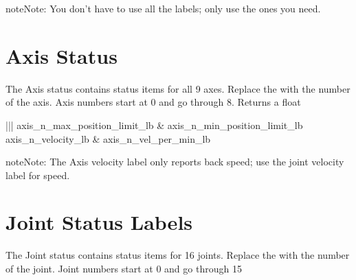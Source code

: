 \documentclass[letterpaper,10pt,english]{sphinxmanual}
\begin{document}
\begin{sphinxadmonition}{note}{Note:}
\sphinxAtStartPar
You don’t have to use all the labels; only use the ones you need.
\end{sphinxadmonition}


\section{Axis Status}
\label{\detokenize{labels:axis-status}}
\sphinxAtStartPar
The Axis status contains status items for all 9 axes. Replace the  with
the number of the axis. Axis numbers start at 0 and go through 8. Returns a
float


\begin{savenotes}\sphinxattablestart
\sphinxthistablewithglobalstyle
\centering
{}
\sphinxthecaptionisattop
{}\label{\detokenize{labels:id2}}
\sphinxaftertopcaption
\begin{tabular}[t]{|||}
\sphinxtoprule
\sphinxtableatstartofbodyhook
\sphinxAtStartPar
axis\_n\_max\_position\_limit\_lb
&
\sphinxAtStartPar
axis\_n\_min\_position\_limit\_lb
\\
\sphinxhline
\sphinxAtStartPar
axis\_n\_velocity\_lb
&
\sphinxAtStartPar
axis\_n\_vel\_per\_min\_lb
\\
\sphinxbottomrule
\end{tabular}
\sphinxtableafterendhook\par
\sphinxattableend\end{savenotes}

\begin{sphinxadmonition}{note}{Note:}
\sphinxAtStartPar
The Axis velocity label only reports back  speed; use the
joint velocity label for  speed.
\end{sphinxadmonition}


\section{Joint Status Labels}
\label{\detokenize{labels:joint-status-labels}}
\sphinxAtStartPar
The Joint status contains status items for 16 joints. Replace the  with
the number of the joint. Joint numbers start at 0 and go through 15
\end{document}
